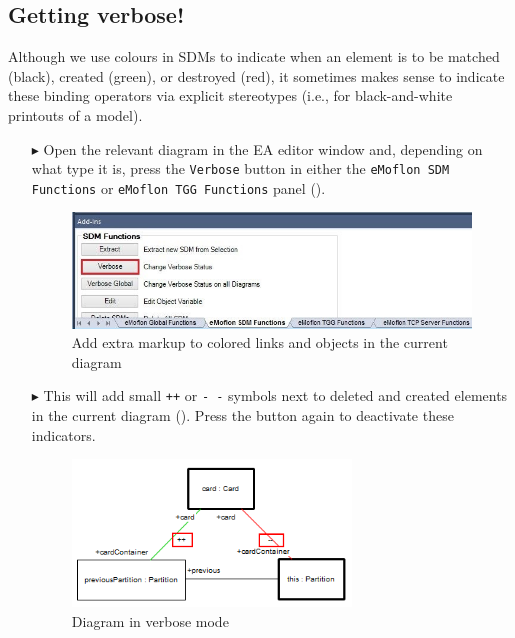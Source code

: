 \subsection{Getting verbose!}

Although we use colours in SDMs to indicate when an element is to be matched (black), created (green), or destroyed (red), it sometimes makes sense to
indicate these binding operators via explicit stereotypes (i.e., for black-and-white printouts of a model).

\begin{enumerate}
  
\item[$\blacktriangleright$] Open the relevant diagram in the EA editor window and, depending on what type it is, press the \texttt{Verbose} button in
either the \texttt{eMoflon SDM Functions} or \texttt{eMoflon TGG Functions} panel ().

\vspace{0.5cm}

\begin{figure}[htbp]
\begin{center}
  \includegraphics[width=\textwidth]{ea_changeVerboseStatus}
  \caption{Add extra markup to colored links and objects in the current diagram}  
  \label{ea:changeVStatus}
\end{center}
\end{figure}

\item[$\blacktriangleright$] This will add small \texttt{++} or \texttt{-~-} symbols next to deleted and created elements in the current diagram
(). Press the button again to deactivate these indicators.

\begin{figure}[htbp]
\begin{center}
  \includegraphics[width=0.7\textwidth]{ea_verboseSymbols}
  \caption{Diagram in verbose mode}  
  \label{ea:verboseSymbols}
\end{center}
\end{figure}

\end{enumerate}
